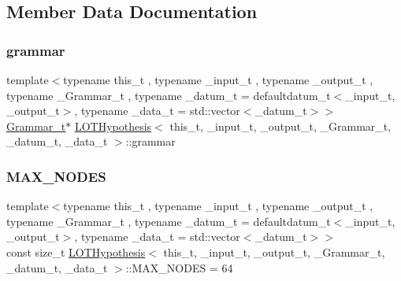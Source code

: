 \subsection{Member Data Documentation}
\mbox{\label{class_l_o_t_hypothesis_af61940657fe62dd86e21077cc64aca2f}} 
\subsubsection{\texorpdfstring{grammar}{grammar}}
{\footnotesize\ttfamily template$<$typename this\+\_\+t , typename \+\_\+input\+\_\+t , typename \+\_\+output\+\_\+t , typename \+\_\+\+Grammar\+\_\+t , typename \+\_\+datum\+\_\+t  = defaultdatum\+\_\+t$<$\+\_\+input\+\_\+t, \+\_\+output\+\_\+t$>$, typename \+\_\+data\+\_\+t  = std\+::vector$<$\+\_\+datum\+\_\+t$>$$>$ \\
\hyperlink{class_l_o_t_hypothesis_a5393058e614835e0f139bd40acb183b2}{Grammar\+\_\+t}$\ast$ \hyperlink{class_l_o_t_hypothesis}{L\+O\+T\+Hypothesis}$<$ this\+\_\+t, \+\_\+input\+\_\+t, \+\_\+output\+\_\+t, \+\_\+\+Grammar\+\_\+t, \+\_\+datum\+\_\+t, \+\_\+data\+\_\+t $>$\+::grammar}

\mbox{\label{class_l_o_t_hypothesis_a4f12a3df12284ee93fa124ad02a9a361}} 
\subsubsection{\texorpdfstring{M\+A\+X\+\_\+\+N\+O\+D\+ES}{MAX\_NODES}}
{\footnotesize\ttfamily template$<$typename this\+\_\+t , typename \+\_\+input\+\_\+t , typename \+\_\+output\+\_\+t , typename \+\_\+\+Grammar\+\_\+t , typename \+\_\+datum\+\_\+t  = defaultdatum\+\_\+t$<$\+\_\+input\+\_\+t, \+\_\+output\+\_\+t$>$, typename \+\_\+data\+\_\+t  = std\+::vector$<$\+\_\+datum\+\_\+t$>$$>$ \\
const size\+\_\+t \hyperlink{class_l_o_t_hypothesis}{L\+O\+T\+Hypothesis}$<$ this\+\_\+t, \+\_\+input\+\_\+t, \+\_\+output\+\_\+t, \+\_\+\+Grammar\+\_\+t, \+\_\+datum\+\_\+t, \+\_\+data\+\_\+t $>$\+::M\+A\+X\+\_\+\+N\+O\+D\+ES = 64\hspace{0.3cm}{\ttfamily [static]}}

